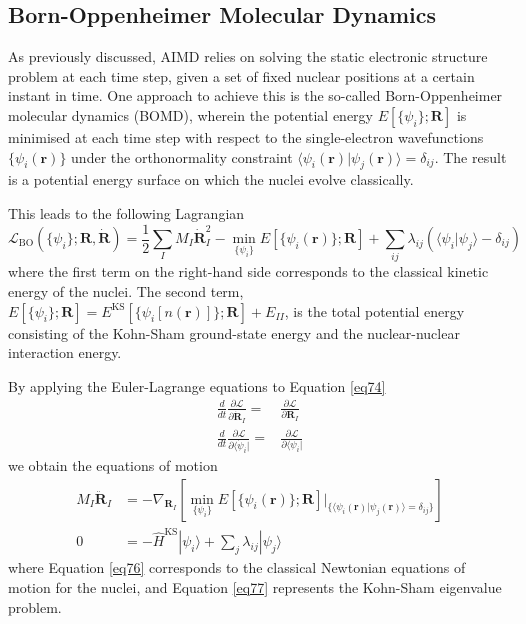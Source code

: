 \subsection{Born-Oppenheimer Molecular Dynamics}
As previously discussed, AIMD relies on solving the static electronic structure 
problem at each time step, given a set of fixed nuclear positions at a certain instant in time.
One approach to achieve this is the so-called Born-Oppenheimer molecular dynamics 
(BOMD)\supercite{Kuhne2014}, wherein the potential energy $E[\{\psi_{i}\}; \mathbf{R}]$ 
is minimised at each time step with respect to the single-electron wavefunctions
$\{\psi_{i}(\mathbf{r})\}$ under the orthonormality constraint 
$\langle \psi_i(\mathbf{r}) | \psi_j(\mathbf{r}) \rangle = \delta_{ij}$. 
The result is a potential energy surface on which the nuclei evolve classically.


This leads to the following Lagrangian
\begin{equation}
    \label{eq74}
    \mathcal{L}_{\text{BO}}(\{\psi_{i}\}; \mathbf{R}, \dot{\mathbf{R}}) =
    \frac{1}{2}\sum_{I} M_{I} \dot{\mathbf{R}}_{I}^2 - \min_{\{\psi_{i}\}} E[\{\psi_{i}(\mathbf{r})\}; \mathbf{R}]
    + \sum_{ij} \lambda_{ij} \left( \langle \psi_i | \psi_j \rangle - \delta_{ij} \right)
\end{equation}
where the first term on the right-hand side corresponds to the classical kinetic energy 
of the nuclei. The second term,
$E[\{\psi_{i}\}; \mathbf{R}] = E^{\text{KS}}[\{\psi_{i}[n(\mathbf{r})]\}; \mathbf{R}] + E_{II}$, is the total 
potential energy consisting of the Kohn-Sham ground-state energy and the 
nuclear-nuclear interaction energy.

By applying the Euler-Lagrange equations to Equation \ref{eq74}
\begin{equation}
    \label{eq75}
\begin{aligned}
    \frac{d}{dt}\frac{\partial \mathcal{L}}{\partial \dot{\mathbf{R}}_{I}} =& \frac{\partial \mathcal{L}}{\partial \mathbf{R}_{I}} \\
    \frac{d}{dt}\frac{\partial \mathcal{L}}{\partial \langle\dot{\psi}_{i}|} =& \frac{\partial \mathcal{L}}{\partial \langle\psi_{i}|}
\end{aligned}
\end{equation}
we obtain the equations of motion 
    \begin{align}
        M_{I}\ddot{\mathbf{R}}_{I} &= -\nabla_{\mathbf{R}_{I}} \left[\min_{\{\psi_{i}\}} E[\{\psi_{i}(\mathbf{r})\}; \mathbf{R}]\bigg|_{\{\langle \psi_i(\mathbf{r}) | \psi_j(\mathbf{r}) \rangle = \delta_{ij}\}} \right]\label{eq76} \\
        0 &= -\hat{H}^{\text{KS}}|\psi_{i}\rangle  + \sum_{j} \lambda_{ij} | \psi_j \rangle \label{eq77}
    \end{align}
where Equation \ref{eq76} corresponds to the classical Newtonian equations of motion for the 
nuclei, and Equation \ref{eq77} represents the Kohn-Sham eigenvalue problem.  

